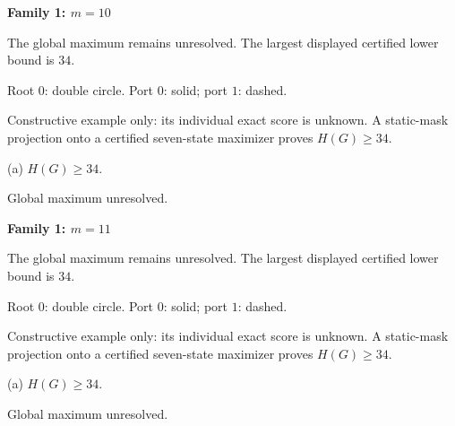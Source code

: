 \documentclass[10pt,a4paper]{article}
\begin{document}
\par\vspace{2.5mm}
\clearpage
{\Large\bfseries Family 1: $m=10$}\par
\vspace{2mm}
{\small The global maximum remains unresolved. The largest displayed certified lower bound is $34$.}\par
\vspace{1mm}
{\small Root $0$: double circle. Port $0$: solid; port $1$: dashed.}\par
\vspace{3mm}
{\small Constructive example only: its individual exact score is unknown. A static-mask projection onto a certified seven-state maximizer proves $H(G)\ge34$.}\par\vspace{2mm}
\noindent\hfill
\begin{minipage}[t]{.96\textwidth}\centering
\resizebox{14cm}{!}{}\par
{\footnotesize (a) $H(G)\ge 34$.\par Global maximum unresolved.}\par
\end{minipage}\hfill
\par\vspace{2.5mm}
\clearpage
{\Large\bfseries Family 1: $m=11$}\par
\vspace{2mm}
{\small The global maximum remains unresolved. The largest displayed certified lower bound is $34$.}\par
\vspace{1mm}
{\small Root $0$: double circle. Port $0$: solid; port $1$: dashed.}\par
\vspace{3mm}
{\small Constructive example only: its individual exact score is unknown. A static-mask projection onto a certified seven-state maximizer proves $H(G)\ge34$.}\par\vspace{2mm}
\noindent\hfill
\begin{minipage}[t]{.96\textwidth}\centering
\resizebox{14cm}{!}{}\par
{\footnotesize (a) $H(G)\ge 34$.\par Global maximum unresolved.}\par
\end{minipage}\hfill
\par\vspace{2.5mm}
\end{document}
